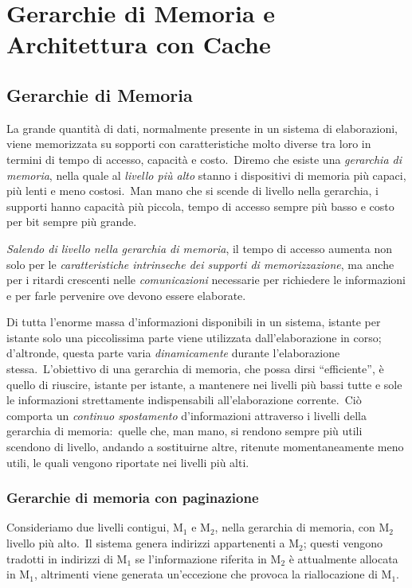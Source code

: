 \chapter{Gerarchie di Memoria e Architettura con Cache}

\section{Gerarchie di Memoria}

La grande quantità di dati, normalmente presente in un sistema di elaborazioni, viene memorizzata su sopporti con caratteristiche molto diverse tra loro in termini di tempo di accesso, capacità e costo.\
Diremo che esiste una \textit{gerarchia di memoria}, nella quale al \textit{livello più alto} stanno i dispositivi di memoria più capaci, più lenti e meno costosi.\
Man mano che si scende di livello nella gerarchia, i supporti hanno capacità più piccola, tempo di accesso sempre più basso e costo per bit sempre più grande.

\textit{Salendo di livello nella gerarchia di memoria}, il tempo di accesso aumenta non solo per le \textit{caratteristiche intrinseche dei supporti di memorizzazione}, ma anche per i ritardi crescenti nelle \textit{comunicazioni} necessarie per richiedere le informazioni e per farle pervenire ove devono essere elaborate.

Di tutta l'enorme massa d'informazioni disponibili in un sistema, istante per istante solo una piccolissima parte viene utilizzata dall'elaborazione in corso; d'altronde, questa parte varia \textit{dinamicamente} durante l'elaborazione stessa.\
L'obiettivo di una gerarchia di memoria, che possa dirsi ``efficiente'', è quello di riuscire, istante per istante, a mantenere nei livelli più bassi tutte e sole le informazioni strettamente indispensabili all'elaborazione corrente.\
Ciò comporta un \textit{continuo spostamento} d'informazioni attraverso i livelli della gerarchia di memoria:\ quelle che, man mano, si rendono sempre più utili scendono di livello, andando a sostituirne altre, ritenute momentaneamente meno utili, le quali vengono riportate nei livelli più alti.

\subsection{Gerarchie di memoria con paginazione}

Consideriamo due livelli contigui, $\mathrm{M}_1$ e $\mathrm{M}_2$, nella gerarchia di memoria, con $\mathrm{M}_2$ livello più alto.\
Il sistema genera indirizzi appartenenti a $\mathrm{M}_2$; questi vengono tradotti in indirizzi di $\mathrm{M}_1$ se l'informazione riferita in $\mathrm{M}_2$ è attualmente allocata in $\mathrm{M}_1$, altrimenti viene generata un'eccezione che provoca la riallocazione di $\mathrm{M}_1$.

